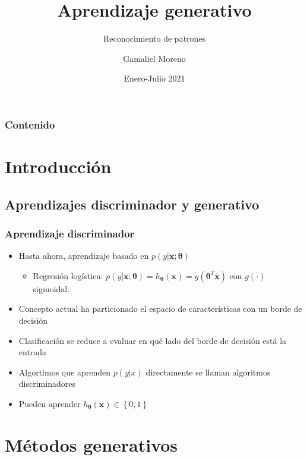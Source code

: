 \documentclass{beamer}
\title{Aprendizaje generativo}
\subtitle{Reconocimiento de patrones}
\author{Gamaliel Moreno}
\date{Enero-Julio 2021}
\institute{\url{gamalielmch@uaz.edu.mx}\\\url{http://pds.uaz.edu.mx/}}
\begin{document}
\begin{frame}[plain,t]
\titlepage
\end{frame}

\begin{frame}%
	\frametitle{Contenido}
\tableofcontents
\end{frame}


\section{Introducción}
\subsection{Aprendizajes discriminador y generativo}
\begin{frame}
\frametitle{Aprendizaje discriminador}
 \begin{itemize}
 \item Hasta ahora, aprendizaje basado en $p(y\vert \boldsymbol{x};\boldsymbol{\theta})$ 
 \begin{itemize}
 \item Regresión logística: $p(y\vert \boldsymbol{x};\boldsymbol{\theta})= h_{\boldsymbol{\theta}}(\boldsymbol{x})= g(\boldsymbol{\theta}^T \boldsymbol{x})$ con $g(\cdot)$ sigmoidal.
 \end{itemize}  
\item Concepto actual ha particionado el espacio de características con un borde de decisión
\item Clasificación se reduce a evaluar en qué lado del borde de decisión está la entrada
\item Algortimos que aprenden $p(y\vert x)$ directamente se llaman algoritmos discriminadores
\item Pueden aprender $h_{\boldsymbol{\theta}}(\boldsymbol{x}) \in \left\lbrace 0,1 \right\rbrace $
 
 \end{itemize}

\end{frame}
\section{Métodos generativos}
\end{document}
